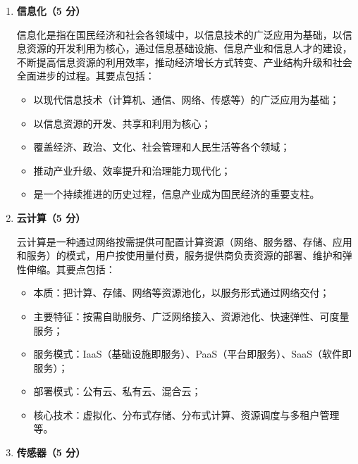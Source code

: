 \documentclass[a4paper,11pt]{article}
\begin{document}
\begin{enumerate}[start=29, label=\textbf{\arabic*.}, leftmargin=2.4em, itemsep=0.55em]

\item \textbf{信息化（5 分）}

信息化是指在国民经济和社会各领域中，以信息技术的广泛应用为基础，以信息资源的开发利用为核心，通过信息基础设施、信息产业和信息人才的建设，不断提高信息资源的利用效率，推动经济增长方式转变、产业结构升级和社会全面进步的过程。其要点包括：
\begin{itemize}[leftmargin=1.8em, itemsep=1pt]
  \item 以现代信息技术（计算机、通信、网络、传感等）的广泛应用为基础；
  \item 以信息资源的开发、共享和利用为核心；
  \item 覆盖经济、政治、文化、社会管理和人民生活等各个领域；
  \item 推动产业升级、效率提升和治理能力现代化；
  \item 是一个持续推进的历史过程，信息产业成为国民经济的重要支柱。
\end{itemize}

\item \textbf{云计算（5 分）}

云计算是一种通过网络按需提供可配置计算资源（网络、服务器、存储、应用和服务）的模式，用户按使用量付费，服务提供商负责资源的部署、维护和弹性伸缩。其要点包括：
\begin{itemize}[leftmargin=1.8em, itemsep=1pt]
  \item 本质：把计算、存储、网络等资源池化，以服务形式通过网络交付；
  \item 主要特征：按需自助服务、广泛网络接入、资源池化、快速弹性、可度量服务；
  \item 服务模式：IaaS（基础设施即服务）、PaaS（平台即服务）、SaaS（软件即服务）；
  \item 部署模式：公有云、私有云、混合云；
  \item 核心技术：虚拟化、分布式存储、分布式计算、资源调度与多租户管理等。
\end{itemize}

\item \textbf{传感器（5 分）}


\end{enumerate}
\end{document}
